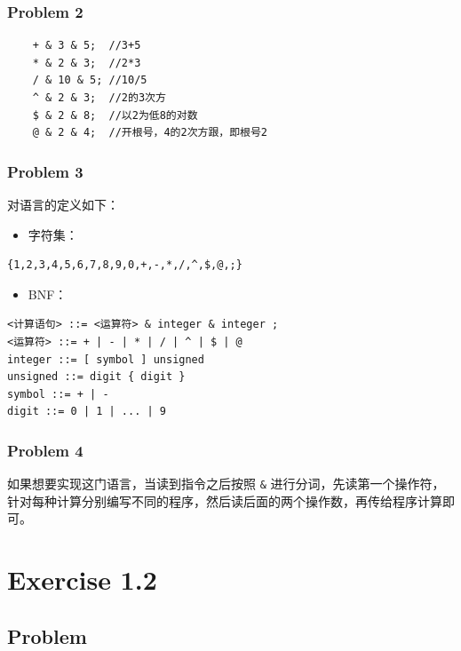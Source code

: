 \subsection{Problem 2}

\begin{lstlisting}
    + & 3 & 5;  //3+5
    * & 2 & 3;  //2*3
    / & 10 & 5; //10/5
    ^ & 2 & 3;  //2的3次方
    $ & 2 & 8;  //以2为低8的对数
    @ & 2 & 4;  //开根号，4的2次方跟，即根号2
\end{lstlisting}

\subsection{Problem 3}

对语言的定义如下：

\begin{itemize}
    \item 字符集：
\end{itemize}

\begin{lstlisting}
{1,2,3,4,5,6,7,8,9,0,+,-,*,/,^,$,@,;}
\end{lstlisting}

\begin{itemize}
    \item BNF：
\end{itemize}

\begin{lstlisting}
<计算语句> ::= <运算符> & integer & integer ;
<运算符> ::= + | - | * | / | ^ | $ | @
integer ::= [ symbol ] unsigned
unsigned ::= digit { digit }
symbol ::= + | -
digit ::= 0 | 1 | ... | 9
\end{lstlisting}

\subsection{Problem 4}

如果想要实现这门语言，当读到指令之后按照 \texttt{\&} 进行分词，先读第一个操作符，针对每种计算分别编写不同的程序，然后读后面的两个操作数，再传给程序计算即可。

\chapter{Exercise 1.2}

\section{Problem}

